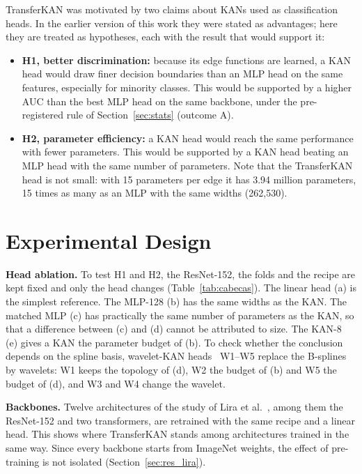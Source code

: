 TransferKAN was motivated by two claims about KANs used as classification heads. In the earlier version of this work they were stated as advantages; here they are treated as hypotheses, each with the result that would support it:
\begin{itemize}
    \item \textbf{H1, better discrimination:} because its edge functions are learned, a KAN head would draw finer decision boundaries than an MLP head on the same features, especially for minority classes. This would be supported by a higher AUC than the best MLP head on the same backbone, under the pre-registered rule of Section~\ref{sec:stats} (outcome A).
    \item \textbf{H2, parameter efficiency:} a KAN head would reach the same performance with fewer parameters. This would be supported by a KAN head beating an MLP head with the same number of parameters. Note that the TransferKAN head is not small: with 15 parameters per edge it has 3.94 million parameters, 15 times as many as an MLP with the same widths (262,530).
\end{itemize}

\section{Experimental Design}
\label{sec:design}

\textbf{Head ablation.} To test H1 and H2, the ResNet-152, the folds and the recipe are kept fixed and only the head changes (Table~\ref{tab:cabecas}). The linear head (a) is the simplest reference. The MLP-128 (b) has the same widths as the KAN. The matched MLP (c) has practically the same number of parameters as the KAN, so that a difference between (c) and (d) cannot be attributed to size. The KAN-8 (e) gives a KAN the parameter budget of (b). To check whether the conclusion depends on the spline basis, wavelet-KAN heads~\cite{bozorgasl2024wavkan} W1--W5 replace the B-splines by wavelets: W1 keeps the topology of (d), W2 the budget of (b) and W5 the budget of (d), and W3 and W4 change the wavelet.



\textbf{Backbones.} Twelve architectures of the study of Lira et al.~\cite{Lira2025deep}, among them the ResNet-152 and two transformers, are retrained with the same recipe and a linear head. This shows where TransferKAN stands among architectures trained in the same way. Since every backbone starts from ImageNet weights, the effect of pre-training is not isolated (Section~\ref{sec:res_lira}).

